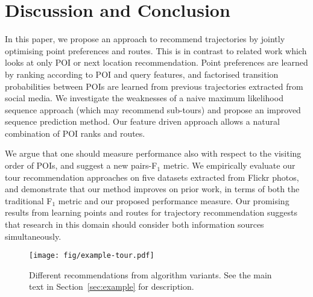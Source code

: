 
\section{Discussion and Conclusion}
\label{sec:conclusion}

In this paper, we propose an approach to recommend trajectories
by jointly optimising point preferences and routes.
This is in contrast to related work which looks at only POI %
or next location recommendation.
Point preferences are learned by ranking according to POI and query features,
and factorised transition probabilities between POIs
are learned from previous trajectories extracted
from social media.
We investigate the weaknesses of a naive maximum likelihood sequence approach (which
may recommend sub-tours) and propose an improved sequence prediction method.
Our feature driven approach allows a natural combination of POI ranks and routes.

We argue that one should measure performance also with respect to the visiting order of POIs,
and suggest a new pairs-F$_1$ metric.
We empirically evaluate our tour recommendation approaches on five datasets extracted from
Flickr photos, and demonstrate that our method improves on prior work,
in terms of both the traditional F$_1$ metric and our proposed performance measure.
Our promising results from learning points and routes for trajectory recommendation suggests
that research in this domain should consider both information sources simultaneously.


\begin{figure*}[t]
	\centering
	\texttt{[image: fig/example-tour.pdf]}
	\caption{Different recommendations from algorithm variants.
    See the main text in Section~\ref{sec:example} for description.}
	\label{fig:exampleresult}
\end{figure*}
